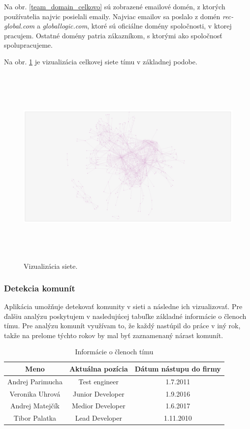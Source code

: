\documentclass[slovak,master,public,dept460,male,cpdeclaration,oneside]{diploma}
\begin{document}
Na obr. \ref{team_domain_celkovo} sú zobrazené emailové domén, z ktorých používatelia najvic posielali emaily. Najviac emailov sa poslalo z domén \textit{rec-global.com} a \textit{globallogic.com}, ktoré sú oficiálne domény spoločnosti, v ktorej pracujem. Ostatné domény patria zákazníkom, s ktorými ako spoločnosť spolupracujeme. 

Na obr. \ref{team_net_celkovo} je vizualizácia celkovej siete tímu v základnej podobe.


\begin{figure}[H]
\centering
\includegraphics[width=16cm, height=10cm]{figures/team_net_celkovo}
\caption{Vizualizácia siete.}
\label{team_net_celkovo}
\end{figure}


\subsubsection{Detekcia komunít}
Aplikácia umožňuje detekovať komunity v sieti a následne ich vizualizovať. Pre ďalšiu analýzu poskytujem v nasledujúcej tabuľke základné informácie o členoch tímu. Pre analýzu komunít využívam to, že každý nastúpil do práce v iný rok, takže na prelome týchto rokov by mal byť zaznamenaný nárast komunít.

\begin{table}[h!]
\centering
\begin{tabular}{ c c c }
 Meno & Aktuálna pozícia &  Dátum nástupu do firmy \\ 
 \hline
 Andrej Parimucha & Test engineer  & 1.7.2011 \\  
 Veronika Uhrová & Junior Developer  & 1.9.2016  \\
 Andrej Matejčík & Medior Developer  & 1.6.2017 \\
 Tibor Palatka & Lead Developer & 1.11.2010 \\
\end{tabular}
\caption{Informácie o členoch tímu}
\end{table} 
\end{document}
